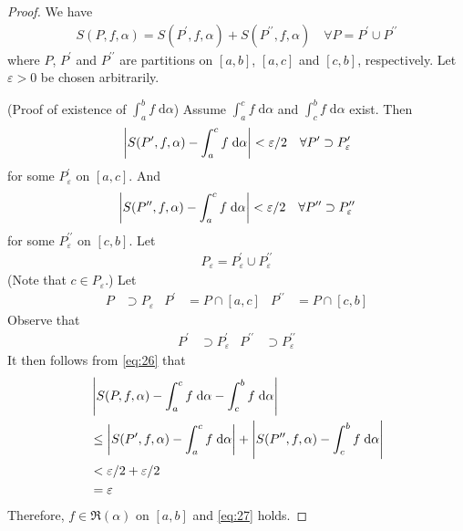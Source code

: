 \documentclass[thmcnt=section, 12pt]{my-elegantbook}
\begin{document}
\begin{proof}
    We have 
    \begin{align}
        S(P,f,\alpha) = S(P^\prime, f, \alpha) + S(P^{\prime\prime}, f, \alpha)
        \quad
        \forall P = P^\prime \cup P^{\prime\prime}
        \label{eq:26}
    \end{align}
    where $P$, $P^\prime$ and $P^{\prime\prime}$ are partitions on $[a, b]$, $[a, c]$ and $[c, b]$, respectively. Let $\varepsilon > 0$ be chosen arbitrarily.

    \par (Proof of existence of $\int_a^b f \; \mathrm{d}\alpha$) Assume $\int_a^c f \; \mathrm{d}\alpha$ and $\int_c^b f \; \mathrm{d}\alpha$ exist. Then 
    \begin{align*}
        \left\lvert S(P^\prime, f, \alpha) - \int_a^c f \; \mathrm{d}\alpha \right\rvert < \varepsilon / 2
        \quad \forall P^\prime \supset P_\varepsilon^\prime
    \end{align*}
    for some $P_\varepsilon^\prime$ on $[a, c]$. And 
    \begin{align*}
        \left\lvert S(P^{\prime\prime}, f, \alpha) - \int_a^c f \; \mathrm{d}\alpha \right\rvert < \varepsilon / 2
        \quad \forall P^{\prime\prime} \supset P_\varepsilon^{\prime\prime}
    \end{align*}
    for some $P_\varepsilon^{\prime\prime}$ on $[c, b]$. Let
    \begin{align*}
        P_\varepsilon = P_\varepsilon^\prime \cup P_\varepsilon^{\prime\prime}
    \end{align*}
    (Note that $c \in P_\varepsilon$.) Let
    \begin{align*}
        P &\supset P_\varepsilon &
        P^\prime &= P \cap [a, c] &
        P^{\prime\prime} &= P \cap [c, b]
    \end{align*}
    Observe that
    \begin{align*}
        P^\prime &\supset P_\varepsilon^\prime & 
        P^{\prime\prime} &\supset P_\varepsilon^{\prime\prime}
    \end{align*}
    It then follows from \eqref{eq:26} that
    \begin{align*}
        &\left\lvert 
            S(P, f, \alpha)
            - \int_a^c f \; \mathrm{d}\alpha
            - \int_c^b f \; \mathrm{d}\alpha 
         \right\rvert \\ 
        &\leq \left\lvert 
            S(P^\prime, f, \alpha)
            - \int_a^c f \; \mathrm{d}\alpha
         \right\rvert + \left\lvert 
            S(P^{\prime\prime}, f, \alpha)
            - \int_c^b f \; \mathrm{d}\alpha
         \right\rvert \\ 
        &< \varepsilon / 2 + \varepsilon / 2 \\ 
        &= \varepsilon
    \end{align*} 
    Therefore, $f \in \mathfrak{R}(\alpha)$ on $[a, b]$ and \eqref{eq:27} holds.


\end{proof}
\end{document}
